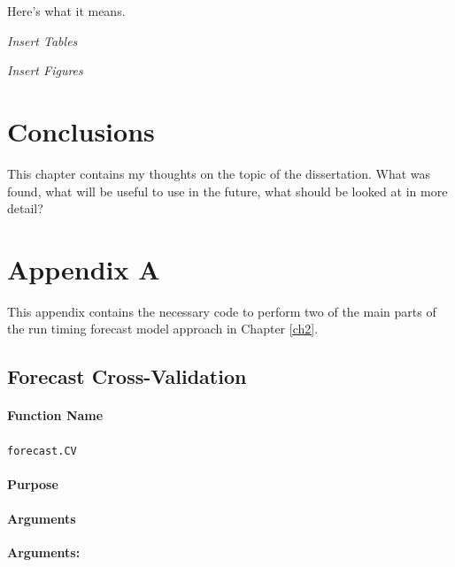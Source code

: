 \documentclass[12pt,]{book}
\theoremstyle{definition}
\theoremstyle{definition}
\theoremstyle{definition}
\theoremstyle{remark}
\begin{document}
Here's what it means.

\emph{Insert Tables}

\emph{Insert Figures}

\chapter{Conclusions}\label{ch5}

This chapter contains my thoughts on the topic of the dissertation. What
was found, what will be useful to use in the future, what should be
looked at in more detail?

\hypertarget{appendix-a}{\chapter*{Appendix A}\label{appendix-a}}

\noindent
This appendix contains the necessary code to perform two of the main
parts of the run timing forecast model approach in Chapter \ref{ch2}.

\section*{Forecast Cross-Validation}\label{forecast-cross-validation}

\subsubsection*{Function Name}\label{function-name}

\texttt{forecast.CV}

\subsubsection*{Purpose}\label{purpose}

\subsubsection*{Arguments}\label{arguments}

\noindent
\textbf{Arguments:}
\end{document}
